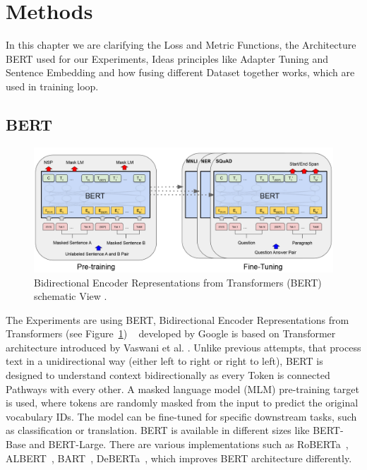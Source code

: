 \section{Methods}\label{sec:methods}
In this chapter we are clarifying the Loss and Metric Functions, the Architecture BERT used for our Experiments, Ideas principles like Adapter Tuning and
Sentence Embedding and how fusing different Dataset together works, which are used in training loop.


\subsection{BERT}
\begin{figure}[b]
    \vspace{-1cm}
    \centering
    \includegraphics[scale=0.22]{./content/BERT_Architecture.png}
    \caption{Bidirectional Encoder Representations from Transformers (BERT) 
             schematic View \cite{devlin_bert_2019}.}
    \label{tab:bert}
\end{figure}

The Experiments are using BERT, Bidirectional Encoder Representations from Transformers (see Figure~\ref{tab:bert}) ~\cite{devlin_bert_2019} 
developed by Google is based on Transformer architecture introduced by Vaswani et al. \cite{vaswani_attention_2023}.
Unlike previous attempts, that process text in a unidirectional way (either left to right or right to 
left), BERT is designed to understand context bidirectionally as every Token is connected Pathways with every other. A masked language model (MLM) 
pre-training target is used, where tokens are randomly masked from the input to predict the original 
vocabulary IDs.
The model can be fine-tuned for specific downstream tasks, such as classification or translation. 
BERT is available in different sizes like BERT-Base and BERT-Large. There are various implementations 
such as RoBERTa~\cite{liu_roberta_2019}, ALBERT~\cite{lan_albert_2020}, BART~\cite{lewis_bart_2020}, 
DeBERTa~\cite{he_deberta_2021}, which improves BERT architecture differently.

